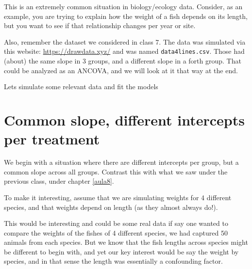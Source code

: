\documentclass[
]{book}
\begin{document}
This is an extremely common situation in biology/ecology data. Consider, as an example, you are trying to explain how the weight of a fish depends on its length, but you want to see if that relationship changes per year or site.

Also, remember the dataset we considered in class 7. The data was simulated via this website: \url{https://drawdata.xyz/} and was named \texttt{data4lines.csv}. Those had (about) the same slope in 3 groups, and a different slope in a forth group. That could be analyzed as an ANCOVA, and we will look at it that way at the end.

Lets simulate some relevant data and fit the models

\hypertarget{common-slope-different-intercepts-per-treatment}{%
\section{Common slope, different intercepts per treatment}\label{common-slope-different-intercepts-per-treatment}}

We begin with a situation where there are different intercepts per group, but a common slope across all groups. Contrast this with what we saw under the previous class, under chapter \ref{aula8}.

To make it interesting, assume that we are simulating weights for 4 different species, and that weights depend on length (as they almost always do!).

This would be interesting and could be some real data if say one wanted to compare the weights of the fishes of 4 different species, we had captured 50 animals from each species. But we know that the fish lengths across species might be different to begin with, and yet our key interest would be say the weight by species, and in that sense the length was essentially a confounding factor.
\end{document}
